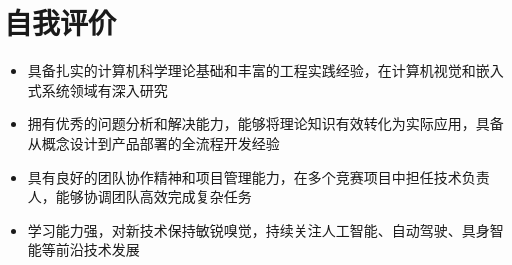 \documentclass{resume}
\begin{document}
\section{自我评价}

\begin{itemize}[parsep=0.5ex]
  \item 具备扎实的计算机科学理论基础和丰富的工程实践经验，在计算机视觉和嵌入式系统领域有深入研究
  \item 拥有优秀的问题分析和解决能力，能够将理论知识有效转化为实际应用，具备从概念设计到产品部署的全流程开发经验
  \item 具有良好的团队协作精神和项目管理能力，在多个竞赛项目中担任技术负责人，能够协调团队高效完成复杂任务
  \item 学习能力强，对新技术保持敏锐嗅觉，持续关注人工智能、自动驾驶、具身智能等前沿技术发展
\end{itemize}
\end{document}
